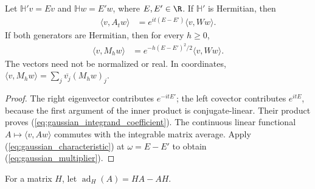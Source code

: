 \begin{theorem}
    \label{thm:gaussian_filter_multiplier}
    \leanok
    Let $\mathbb H'v=Ev$ and $\mathbb Hw=E'w$, where $E,E'\in\R$.
    If $\mathbb H'$ is Hermitian, then
    \begin{align}
        \langle v,A_tw\rangle
            &=e^{it(E-E')}\langle v,Ww\rangle.
        \label{eq:gaussian_integrand_coefficient}
    \end{align}
    If both generators are Hermitian, then for every $h\ge0$,
    \begin{align}
        \langle v,M_hw\rangle
            &=e^{-h(E-E')^2/2}\langle v,Ww\rangle.
        \label{eq:gaussian_multiplier}
    \end{align}
    The vectors need not be normalized or real. In coordinates,
    $\langle v,M_hw\rangle=\sum_j\overline{v_j}(M_hw)_j$.
\end{theorem}
\begin{proof}\leanok
    The right eigenvector contributes $e^{-itE'}$; the left covector
    contributes $e^{itE}$, because the first argument of the inner
    product is conjugate-linear. Their product proves
    (\ref{eq:gaussian_integrand_coefficient}). The continuous linear
    functional $A\mapsto\langle v,Aw\rangle$ commutes with the
    integrable matrix average. Apply
    (\ref{eq:gaussian_characteristic}) at $\omega=E-E'$ to obtain
    (\ref{eq:gaussian_multiplier}).
\end{proof}

\begin{definition}
    \label{def:gaussian_commutator_operator}
    \leanok
    For a matrix $H$, let $\operatorname{ad}_H(A)=HA-AH$.
\end{definition}

